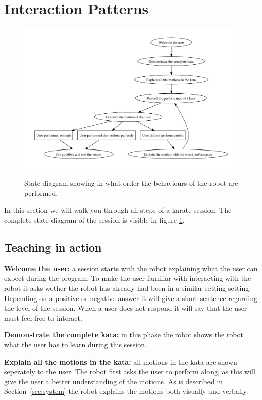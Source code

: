 \documentclass[10pt,a4paper,oneside]{scrartcl}
\begin{document}
\section{Interaction Patterns}
\begin{figure}[!ht]
	\centering
	\includegraphics[width=\textwidth]{images/stateDiagram}
	\label{fig:state-diagram}
	\caption{State diagram showing in what order the behaviours of the robot are performed.}
\end{figure}
In this section we will walk you through all steps of a karate session. 
The complete state diagram of the session is visible in figure \ref{fig:state-diagram}. 




\subsection{Teaching in action}
\textbf{Welcome the user:} a session starts with the robot explaining what the user can expect during the program. 
To make the user familiar with interacting with the robot it asks wether the robot has already had been in a similar setting setting. 
Depending on a positive or negative answer it will give a short sentence regarding the level of the session. 
When a user does not respond it will say that the user must feel free to interact. 

\textbf{Demonstrate the complete kata:} in this phase the robot shows the robot what the user has to learn during this session. 


\textbf{Explain all the motions in the kata:} all motions in the kata are shown seperately to the user. 
The robot first asks the user to perform along, as this will give the user a better understanding of the motions. 
As is described in Section~\ref{sec:system} the robot explains the motions both visually and verbally. 
\end{document}

